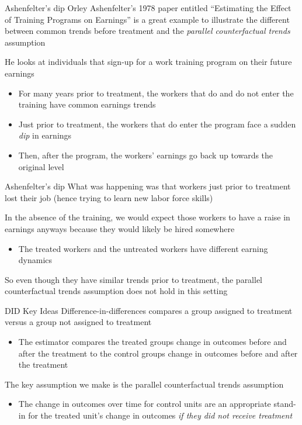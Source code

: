 \documentclass[aspectratio=169,t,11pt,table]{beamer}
\begin{document}
\begin{frame}{Ashenfelter's dip}
  Orley Ashenfelter's 1978 paper entitled ``Estimating the Effect of Training Programs on Earnings'' is a great example to illustrate the different between common trends before treatment and the \emph{parallel counterfactual trends} assumption

  \pause
  \bigskip
  He looks at individuals that sign-up for a work training program on their future earnings
  \begin{itemize}
    \item For many years prior to treatment, the workers that do and do not enter the training have common earnings trends
    
    \item Just prior to treatment, the workers that do enter the program face a sudden \emph{dip} in earnings
    
    \item Then, after the program, the workers' earnings go back up towards the original level
  \end{itemize}
\end{frame}

\begin{frame}{Ashenfelter's dip}
  What was happening was that workers just prior to treatment lost their job (hence trying to learn new labor force skills)

  \pause
  \bigskip
  In the absence of the training, we would expect those workers to have a raise in earnings anyways because they would likely be hired somewhere
  \begin{itemize}
    \item The treated workers and the untreated workers have different earning dynamics
  \end{itemize}

  \bigskip
  So even though they have similar trends prior to treatment, the parallel counterfactual trends assumption does not hold in this setting
\end{frame}


\begin{frame}{DID Key Ideas}
  \alert{Difference-in-differences} compares a group assigned to treatment versus a group not assigned to treatment
  \begin{itemize}
    \item The estimator compares the treated groups change in outcomes before and after the treatment to the control groups change in outcomes before and after the treatment
  \end{itemize}

  \bigskip
  The key assumption we make is the \alert{parallel counterfactual trends} assumption
  \begin{itemize}
    \item The change in outcomes over time for control units are an appropriate stand-in for the treated unit's change in outcomes \emph{if they did not receive treatment}
  \end{itemize}
\end{frame}
\end{document}
